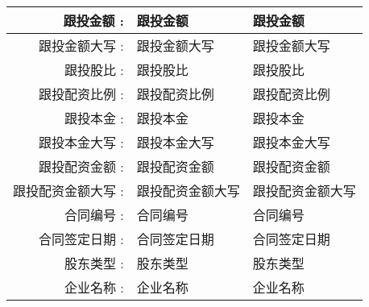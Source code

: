 \documentclass[12pt, letterpaper, twoside]{ctexart}
\begin{document}
\begin{longtable}[1\textwidth]{ |r|p{}|l| }
\hline
跟投金额 :& {{跟投金额}} & 跟投金额 \\
\hline
跟投金额大写 :& {{跟投金额大写}} & 跟投金额大写 \\
\hline
跟投股比 :& {{跟投股比}} & 跟投股比 \\
\hline
跟投配资比例 :& {{跟投配资比例}} & 跟投配资比例 \\
\hline
跟投本金 :& {{跟投本金}} & 跟投本金 \\
\hline
跟投本金大写 :& {{跟投本金大写}} & 跟投本金大写 \\
\hline
跟投配资金额 :& {{跟投配资金额}} & 跟投配资金额 \\
\hline
跟投配资金额大写 :& {{跟投配资金额大写}} & 跟投配资金额大写 \\
\hline
合同编号 :& {{合同编号}} & 合同编号 \\
\hline
合同签定日期 :& {{合同签定日期}} & 合同签定日期 \\
\hline
股东类型 :& {{股东类型}} & 股东类型 \\
\hline
企业名称 :& {{企业名称}} & 企业名称 \\
\hline
\end{longtable}
\end{document}
